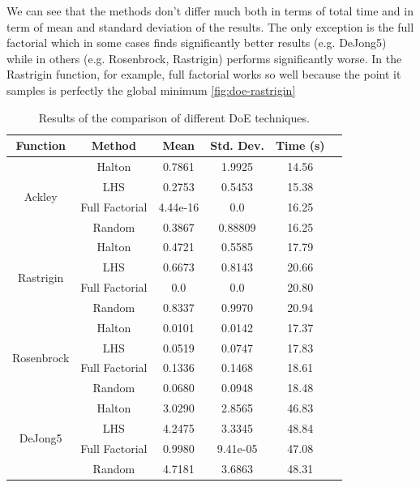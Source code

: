 We can see that the methods don't differ much both in terms of total time and in term of mean and standard deviation of the results. The only exception is the full factorial which in some cases finds significantly better results (e.g. DeJong5) while in others (e.g. Rosenbrock, Rastrigin) performs significantly worse. In the Rastrigin function, for example, full factorial works so well because the point it samples is perfectly the global minimum \ref{fig:doe-rastrigin}


\begin{table}[H]
    \centering
    \begin{tabular}{|c|c|c|c|c|c|}
        Function                    & Method         & Mean     & Std. Dev. & Time (s) \\ \hline
        \multirow{4}{*}{Ackley}     & Halton         & 0.7861   & 1.9925    & 14.56    \\
                                    & LHS            & 0.2753   & 0.5453    & 15.38    \\
                                    & Full Factorial & 4.44e-16 & 0.0       & 16.25    \\
                                    & Random         & 0.3867   & 0.88809   & 16.25    \\ \hline
        \multirow{4}{*}{Rastrigin}  & Halton         & 0.4721   & 0.5585    & 17.79    \\
                                    & LHS            & 0.6673   & 0.8143    & 20.66    \\
                                    & Full Factorial & 0.0      & 0.0       & 20.80    \\
                                    & Random         & 0.8337   & 0.9970    & 20.94    \\ \hline
        \multirow{4}{*}{Rosenbrock} & Halton         & 0.0101   & 0.0142    & 17.37    \\
                                    & LHS            & 0.0519   & 0.0747    & 17.83    \\
                                    & Full Factorial & 0.1336   & 0.1468    & 18.61    \\
                                    & Random         & 0.0680   & 0.0948    & 18.48    \\ \hline
        \multirow{4}{*}{DeJong5}    & Halton         & 3.0290   & 2.8565    & 46.83    \\
                                    & LHS            & 4.2475   & 3.3345    & 48.84    \\
                                    & Full Factorial & 0.9980   & 9.41e-05  & 47.08    \\
                                    & Random         & 4.7181   & 3.6863    & 48.31    \\ \hline
    \end{tabular}
    \caption{Results of the comparison of different DoE techniques.}
    \label{tab:doe-comparison}
\end{table}

